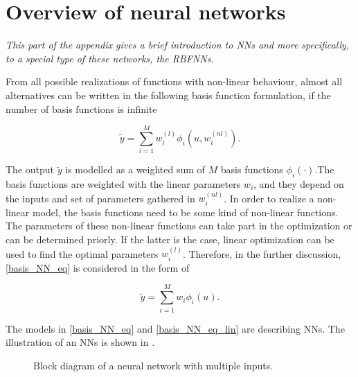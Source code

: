 
\chapter{Overview of neural networks}
\label{neural_networks}

\emph{This part of the appendix gives a brief introduction to NNs and more specifically, to a special type of these networks, the RBFNNs. }

From all possible realizations of functions with non-linear behaviour, almost all alternatives can be written in the following basis function formulation, if the number of basis functions is infinite \cite{norgaard2003neural}

\begin{equation}
\label{basis_NN_eq}
\tilde{y} = \sum_{i = 1}^M w^{(l)}_i \phi_i(u, w^{(nl)}_i).
\end{equation}

The output $\tilde{y}$ is modelled as a weighted sum of $M$ basis functions $\phi_i(\cdot)$.The basis functions are weighted with the linear parameters $w_i$, and they depend on the inputs and set of parameters gathered in $w^{(nl)}_i$. In order to realize a non-linear model, the basis functions need to be some kind of non-linear functions. The parameters of these non-linear functions can take part in the optimization or can be determined priorly. If the latter is the case, linear optimization can be used to find the optimal parameters $w^{(l)}_i$. Therefore, in the further discussion, \eqref{basis_NN_eq} is considered in the form of

 \begin{equation}
\label{basis_NN_eq_lin}
\tilde{y} = \sum_{i = 1}^M w_i \phi_i(u).
\end{equation}

The models in \eqref{basis_NN_eq} and \eqref{basis_NN_eq_lin} are describing NNs. The illustration of an NNs is shown in .

\vspace{-5mm}

\begin{figure}[H]
\centering
 
\caption{Block diagram of a neural network with multiple inputs.}
\label{fig:nn_example_block}
\end{figure}

\vspace{-3mm}

